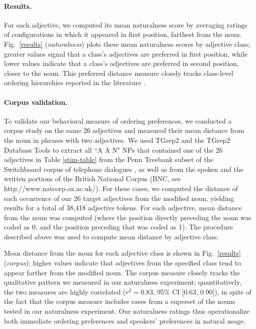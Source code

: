 \documentclass[12pt]{article}
\begin{document}
\paragraph{Results.} For each adjective, we computed its mean naturalness score by averaging ratings of configurations in which it appeared in first position, farthest from the noun. Fig.\ \ref{results} (\emph{naturalness}) plots these mean naturalness scores by adjective class; greater values signal that a class's adjectives are preferred in first position, while lower values indicate that a class's adjectives are preferred in second position, closer to the noun. This preferred distance measure closely tracks class-level ordering hierarchies reported in the literature \citep{dixon1982,Sproat1991}.

\paragraph{Corpus validation.} To validate our behavioral measure of ordering preferences, we conducted a corpus study on the same 26 adjectives and measured their mean distance from the noun in phrases with two adjectives. We used TGrep2 \citep{rohde2005} and the TGrep2 Database Tools \citep{Degen2011} to extract all ``A A N"  NPs that contained one of the 26 adjectives in Table \ref{stim-table} from the Penn Treebank subset of the Switchboard corpus of telephone dialogues \citep{godfrey1992}, as well as from the spoken and the written portions of the British National Corpus (BNC, see http://www.natcorp.ox.ac.uk/). For these cases, we computed the distance of each occurrence of our 26 target adjectives from the modified noun, yielding results for a total of 38,418 adjective tokens.  For each adjective, mean distance from the noun was computed (where the position directly preceding the noun was coded as 0, and the position preceding that was coded as 1). The procedure described above was used to compute mean distance by adjective class.

Mean distance from the noun for each adjective class is shown in Fig.~\ref{results} (\emph{corpus}); higher values indicate that adjectives from the specified class tend to appear farther from the modified noun. The corpus measure closely tracks the qualitative pattern we measured in our naturalness experiment; quantitatively, the two measures are highly correlated ($r^{2}=0.83$, 95\% CI [0.63, 0.90]), in spite of the fact that the corpus measure includes cases from a superset of the nouns tested in our naturalness experiment. Our naturalness ratings thus operationalize both immediate ordering preferences and speakers' preferences in natural usage.
\end{document}

